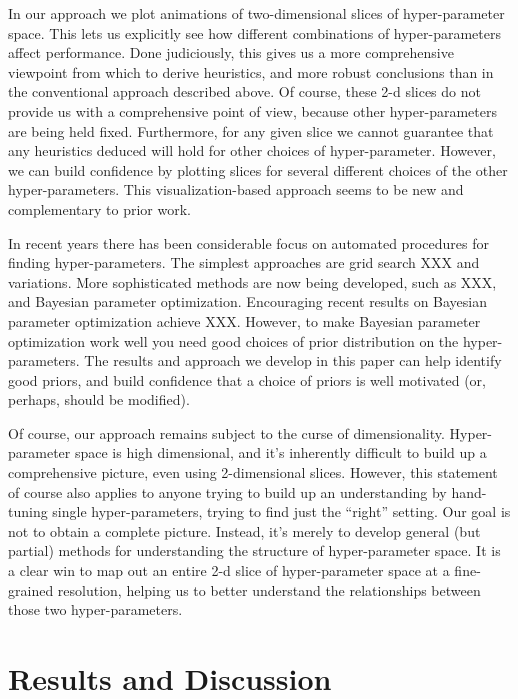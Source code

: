 \documentclass[10pt]{article}
\begin{document}
%
%
In our approach we plot animations of two-dimensional slices of
hyper-parameter space.  This lets us explicitly see how different
combinations of hyper-parameters affect performance.  Done
judiciously, this gives us a more comprehensive viewpoint from which
to derive heuristics, and more robust conclusions than in the
conventional approach described above.  Of course, these 2-d slices do
not provide us with a comprehensive point of view, because other
hyper-parameters are being held fixed.  Furthermore, for any given
slice we cannot guarantee that any heuristics deduced will hold for
other choices of hyper-parameter.  However, we can build confidence by
plotting slices for several different choices of the other
hyper-parameters.  This visualization-based approach seems to be new
and complementary to prior work.

%
%
In recent years there has been considerable focus on automated
procedures for finding hyper-parameters.  The simplest approaches are
grid search XXX and variations.  More sophisticated methods are now
being developed, such as XXX, and Bayesian parameter optimization.
Encouraging recent results on Bayesian parameter optimization achieve
XXX.  However, to make Bayesian parameter optimization work well you
need good choices of prior distribution on the hyper-parameters.  The
results and approach we develop in this paper can help identify good
priors, and build confidence that a choice of priors is well motivated
(or, perhaps, should be modified).

%
%
Of course, our approach remains subject to the curse of
dimensionality.  Hyper-parameter space is high dimensional, and it's
inherently difficult to build up a comprehensive picture, even using
2-dimensional slices.  However, this statement of course also applies
to anyone trying to build up an understanding by hand-tuning single
hyper-parameters, trying to find just the ``right'' setting.  Our goal
is not to obtain a complete picture.  Instead, it's merely to develop
general (but partial) methods for understanding the structure of
hyper-parameter space.  It is a clear win to map out an entire 2-d
slice of hyper-parameter space at a fine-grained resolution, helping
us to better understand the relationships between those two
hyper-parameters.

\section*{Results and Discussion}
\end{document}
